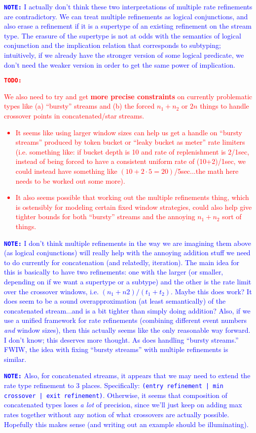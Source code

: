 \documentclass[acmsmall,nonacm,screen]{acmart}
\newcommand{\todo}[1]{\textcolor{red}{\textbf{\texttt{TODO:}} {#1}}}
\newcommand{\note}[1]{\textcolor{blue}{\textbf{\texttt{NOTE:}} {#1}}}
\begin{document}
\note{I actually don't think these two interpretations of multiple rate refinements are contradictory. We can treat multiple refinements as logical conjunctions, and also erase a refinement if it is a supertype of an existing refinement on the stream type. The erasure of the supertype is not at odds with the semantics of logical conjunction and the implication relation that corresponds to subtyping; intuitively, if we already have the stronger version of some logical predicate, we don't need the weaker version in order to get the same power of implication.}

\todo{We also need to try and get \textbf{more precise constraints} on currently problematic types like (a) ``bursty'' streams and (b) the forced $n_1+n_2$ or $2n$ things to handle crossover points in concatenated/star streams.
  \begin{itemize}
  \item It seems like using larger window sizes can help us get a handle on ``bursty streams'' produced by token bucket or ``leaky bucket as meter'' rate limiters (i.e. something like: if bucket depth is 10 and rate of replenishment is 2/1sec, instead of being forced to have a consistent uniform rate of (10+2)/1sec, we could instead have something like $(10+2\cdot 5 = 20)$/5sec...the math here needs to be worked out some more).
  \item It also seems possible that working out the multiple refinements thing, which is ostensibly for modeling certain fixed window strategies, could also help give tighter bounds for both ``bursty'' streams and the annoying $n_1+n_2$ sort of things.
  \end{itemize}}

\note{I don't think multiple refinements in the way we are imagining them above (as logical conjunctions) will really help with the annoying addition stuff we need to do currently for concatenation (and relatedly, iteration). The main idea for this is basically to have two refinements: one with the larger (or smaller, depending on if we want a supertype or a subtype) and the other is the rate limit over the crossover windows, i.e. $(n_1 + n2)/(t_1 + t_2)$. Maybe this does work? It does seem to be a sound overapproximation (at least semantically) of the concatenated stream...and is a bit tighter than simply doing addition? Also, if we use a unified framework for rate refinements (combining different event numbers \textit{and} window sizes), then this actually seems like the only reasonable way forward. I don't know; this deserves more thought. As does handling ``bursty streams.'' FWIW, the idea with fixing ``bursty streams'' with multiple refinements is similar.}

\note{Also, for concatenated streams, it appears that we may need to extend the rate type refinement to 3 places. Specifically: \texttt{(entry refinement | min crossover | exit refinement)}. Otherwise, it seems that composition of concatenated types loses \textit{a lot} of precision, since we'll just keep on adding max rates together without any notion of what crossovers are actually possible. Hopefully this makes sense (and writing out an example should be illuminating).}



\end{document}
